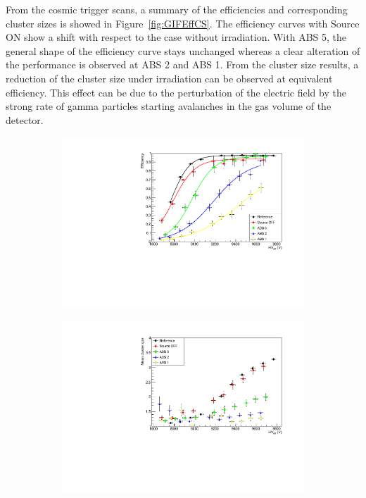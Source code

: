	From the cosmic trigger scans, a summary of the efficiencies and corresponding cluster sizes is showed in Figure~\ref{fig:GIFEffCS}. The efficiency curves with Source ON show a shift with respect to the case without irradiation. With ABS 5, the general shape of the efficiency curve stays unchanged whereas a clear alteration of the performance is observed at ABS 2 and ABS 1. From the cluster size results, a reduction of the cluster size under irradiation can be observed at equivalent efficiency. This effect can be due to the perturbation of the electric field by the strong rate of gamma particles starting avalanches in the gas volume of the detector.
	
	\begin{figure}[H]
    	\begin{subfigure}{0.5\linewidth}
			\centering
			\includegraphics[width = 0.7\plotwidth]{fig/chapt5/Efficiency.pdf}
        	\caption{\label{fig:GIFEffCS:A}}
    	\end{subfigure}
    	\begin{subfigure}{0.5\linewidth}
			\centering
			\includegraphics[width = 0.7\plotwidth]{fig/chapt5/Cluster-Size.pdf}

\end{subfigure}
\end{figure}
